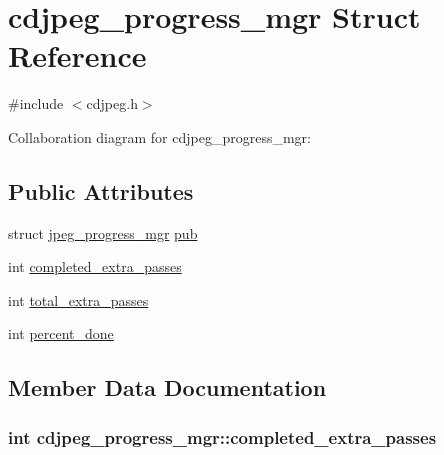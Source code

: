\hypertarget{structcdjpeg__progress__mgr}{}\section{cdjpeg\+\_\+progress\+\_\+mgr Struct Reference}
\label{structcdjpeg__progress__mgr}


{\ttfamily \#include $<$cdjpeg.\+h$>$}



Collaboration diagram for cdjpeg\+\_\+progress\+\_\+mgr\+:
\subsection*{Public Attributes}
\begin{DoxyCompactItemize}
\item 
struct \hyperlink{structjpeg__progress__mgr}{jpeg\+\_\+progress\+\_\+mgr} \hyperlink{structcdjpeg__progress__mgr_a6303d12ac00b08da19794945793f983f}{pub}
\item 
int \hyperlink{structcdjpeg__progress__mgr_a6f5f9744a8fc43219bbb42d1757820e6}{completed\+\_\+extra\+\_\+passes}
\item 
int \hyperlink{structcdjpeg__progress__mgr_a05c1a823d40d937b105e3ba2c13bc00d}{total\+\_\+extra\+\_\+passes}
\item 
int \hyperlink{structcdjpeg__progress__mgr_a73fad2ed10876758edc5523d1cb10f8f}{percent\+\_\+done}
\end{DoxyCompactItemize}


\subsection{Member Data Documentation}
\hypertarget{structcdjpeg__progress__mgr_a6f5f9744a8fc43219bbb42d1757820e6}{}
\subsubsection[{completed\+\_\+extra\+\_\+passes}]{\setlength{\rightskip}{0pt plus 5cm}int cdjpeg\+\_\+progress\+\_\+mgr\+::completed\+\_\+extra\+\_\+passes}\label{structcdjpeg__progress__mgr_a6f5f9744a8fc43219bbb42d1757820e6}
\hypertarget{structcdjpeg__progress__mgr_a73fad2ed10876758edc5523d1cb10f8f}{}
